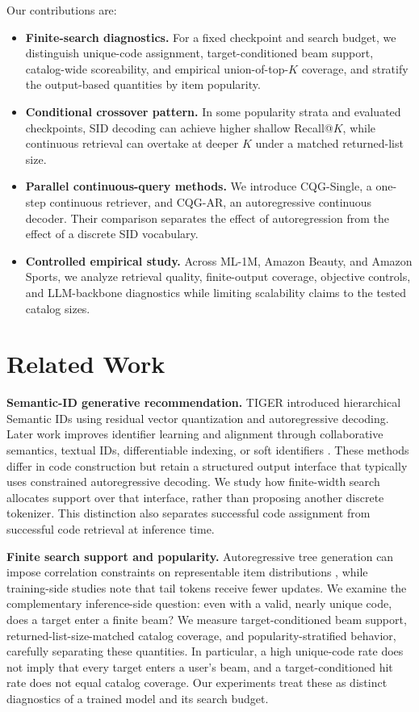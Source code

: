 \documentclass[letterpaper]{article}
\begin{document}
Our contributions are:
\begin{itemize}
    \item \textbf{Finite-search diagnostics.} For a fixed checkpoint and search
    budget, we distinguish unique-code assignment, target-conditioned beam
    support, catalog-wide scoreability, and empirical union-of-top-$K$
    coverage, and stratify the output-based quantities by item popularity.
    \item \textbf{Conditional crossover pattern.} In some popularity strata
    and evaluated checkpoints, SID decoding can achieve higher shallow
    Recall@$K$, while continuous retrieval can overtake at deeper $K$ under a
    matched returned-list size.
    \item \textbf{Parallel continuous-query methods.} We introduce CQG-Single, a one-step continuous retriever, and CQG-AR, an autoregressive continuous decoder. Their comparison separates the effect of autoregression from the effect of a discrete SID vocabulary.
    \item \textbf{Controlled empirical study.} Across ML-1M, Amazon Beauty,
    and Amazon Sports, we analyze retrieval quality, finite-output coverage,
    objective controls, and LLM-backbone diagnostics while limiting
    scalability claims to the tested catalog sizes.
\end{itemize}

\section{Related Work}

\textbf{Semantic-ID generative recommendation.}
TIGER \citep{rajput2023tiger} introduced hierarchical Semantic IDs using
residual vector quantization and autoregressive decoding. Later work improves
identifier learning and alignment through collaborative semantics, textual
IDs, differentiable indexing, or soft identifiers
\citep{zheng2024letter,wang2024eager,tan2024idgenrec,fu2026diger,li2026unigrec}.
These methods differ in code construction but retain a structured output
interface that typically uses constrained autoregressive decoding. We study
how finite-width search allocates support over that interface, rather than
proposing another discrete tokenizer. This distinction also separates
successful code assignment from successful code retrieval at inference time.

\textbf{Finite search support and popularity.}
Autoregressive tree generation can impose correlation constraints on
representable item distributions \citep{hou2026expressiveness}, while
training-side studies note that tail tokens receive fewer updates. We examine
the complementary inference-side question: even with a valid, nearly unique
code, does a target enter a finite beam? We measure target-conditioned beam
support, returned-list-size-matched catalog coverage, and popularity-stratified behavior,
carefully separating these quantities. In particular, a high unique-code rate
does not imply that every target enters a user's beam, and a target-conditioned
hit rate does not equal catalog coverage. Our experiments treat these as
distinct diagnostics of a trained model and its search budget.
\end{document}
